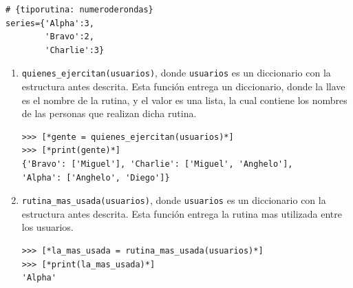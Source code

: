 \begin{lstlisting}[style=consola]
# {tiporutina: numeroderondas}
series={'Alpha':3,
        'Bravo':2,
        'Charlie':3}
\end{lstlisting}



\begin{enumerate}
    \item \texttt{quienes\_ejercitan(usuarios)}, donde \texttt{usuarios} es un diccionario con la estructura antes descrita. Esta función entrega un diccionario, donde la llave es el nombre de la rutina, y el valor es una lista, la cual contiene los nombres de las personas que realizan dicha rutina.

\begin{lstlisting}[style=consola]
>>> [*gente = quienes_ejercitan(usuarios)*]
>>> [*print(gente)*]
{'Bravo': ['Miguel'], 'Charlie': ['Miguel', 'Anghelo'],
'Alpha': ['Anghelo', 'Diego']}
\end{lstlisting}
\pagebreak[4]
    \item \texttt{rutina\_mas\_usada(usuarios)}, donde \texttt{usuarios} es un diccionario con la estructura antes descrita. Esta función entrega la rutina mas utilizada entre los usuarios.

\begin{lstlisting}[style=consola]
>>> [*la_mas_usada = rutina_mas_usada(usuarios)*]
>>> [*print(la_mas_usada)*]
'Alpha'
\end{lstlisting}


\end{enumerate}
